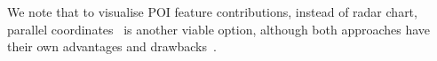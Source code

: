 \documentclass[sigconf]{acmart}
\begin{document}
We note that to visualise POI feature contributions, instead of radar chart, parallel coordinates~\cite{parallel_coord} is another viable option,
although both approaches have their own advantages and drawbacks~\cite{robbins2005creating}.



 
\end{document}
